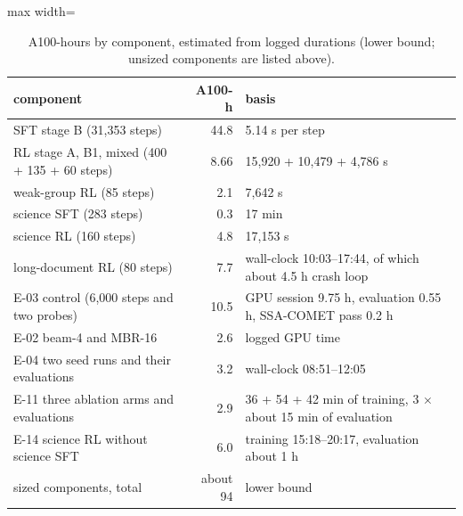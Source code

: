 \begin{table}[h]
\centering\small
\caption{A100-hours by component, estimated from logged durations (lower bound; unsized components are listed above).}\label{tab:compute}
\begin{adjustbox}{max width=\linewidth}\begin{tabular}{@{}lrl@{}}
\toprule
component & A100-h & basis\\
\midrule
SFT stage B (31,353 steps) & 44.8 & 5.14 s per step\\
RL stage A, B1, mixed (400 + 135 + 60 steps) & 8.66 & 15,920 + 10,479 + 4,786 s\\
weak-group RL (85 steps) & 2.1 & 7,642 s\\
science SFT (283 steps) & 0.3 & 17 min\\
science RL (160 steps) & 4.8 & 17,153 s\\
long-document RL (80 steps) & 7.7 & wall-clock 10:03--17:44, of which about 4.5 h crash loop\\
E-03 control (6,000 steps and two probes) & 10.5 & GPU session 9.75 h, evaluation 0.55 h, SSA-COMET pass 0.2 h\\
E-02 beam-4 and MBR-16 & 2.6 & logged GPU time\\
E-04 two seed runs and their evaluations & 3.2 & wall-clock 08:51--12:05\\
E-11 three ablation arms and evaluations & 2.9 & 36 + 54 + 42 min of training, 3 $\times$ about 15 min of evaluation\\
E-14 science RL without science SFT & 6.0 & training 15:18--20:17, evaluation about 1 h\\
\midrule
sized components, total & about 94 & lower bound\\
\bottomrule
\end{tabular}\end{adjustbox}
\end{table}

